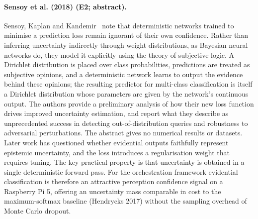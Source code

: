 \documentclass[10pt,a4paper]{article}
\begin{document}
\paragraph{Sensoy et al. (2018) (E2; abstract).} Sensoy, Kaplan and Kandemir~\cite{Sensoy2018} note that deterministic networks trained to minimise a prediction loss remain ignorant of their own confidence. Rather than inferring uncertainty indirectly through weight distributions, as Bayesian neural networks do, they model it explicitly using the theory of subjective logic. A Dirichlet distribution is placed over class probabilities, predictions are treated as subjective opinions, and a deterministic network learns to output the evidence behind these opinions; the resulting predictor for multi-class classification is itself a Dirichlet distribution whose parameters are given by the network's continuous output. The authors provide a preliminary analysis of how their new loss function drives improved uncertainty estimation, and report what they describe as unprecedented success in detecting out-of-distribution queries and robustness to adversarial perturbations. The abstract gives no numerical results or datasets. Later work has questioned whether evidential outputs faithfully represent epistemic uncertainty, and the loss introduces a regularisation weight that requires tuning. The key practical property is that uncertainty is obtained in a single deterministic forward pass. For the orchestration framework evidential classification is therefore an attractive perception confidence signal on a Raspberry Pi 5, offering an uncertainty mass comparable in cost to the maximum-softmax baseline (Hendrycks 2017) without the sampling overhead of Monte Carlo dropout.
\end{document}

